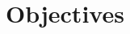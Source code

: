 \documentclass[slidestop,compress,11pt,xcolor=dvipsnames]{beamer}
\begin{document}


\section{Objectives}
\end{document}
